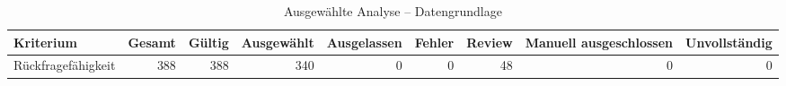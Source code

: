 \begin{table}[htbp]
\centering
\caption{Ausgewählte Analyse -- Datengrundlage}
\begin{tabular}{lrrrrrrrr}
\toprule
Kriterium & Gesamt & Gültig & Ausgewählt & Ausgelassen & Fehler & Review & Manuell ausgeschlossen & Unvollständig \\
\midrule
Rückfragefähigkeit & 388 & 388 & 340 & 0 & 0 & 48 & 0 & 0 \\
\bottomrule
\end{tabular}
\end{table}
